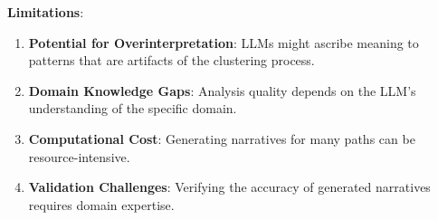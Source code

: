 \textbf{Limitations}:
\begin{enumerate}
    \item \textbf{Potential for Overinterpretation}: LLMs might ascribe meaning to patterns that are artifacts of the clustering process.
    \item \textbf{Domain Knowledge Gaps}: Analysis quality depends on the LLM's understanding of the specific domain.
    \item \textbf{Computational Cost}: Generating narratives for many paths can be resource-intensive.
    \item \textbf{Validation Challenges}: Verifying the accuracy of generated narratives requires domain expertise.
\end{enumerate}

\iffalse
Our experiments show that these narratives can effectively translate complex mathematical relationships into intuitive explanations that capture the essence of the model's internal behavior.

### 6.4 Bias Auditing Through LLMs
... (placeholder content removed) ...
\fi